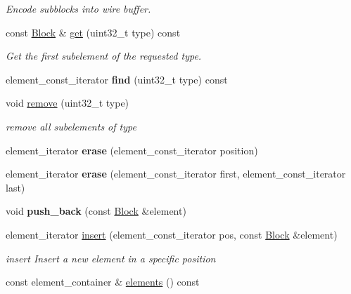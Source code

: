 \begin{DoxyCompactItemize}
\begin{DoxyCompactList}\small\item\em Encode subblocks into wire buffer. \end{DoxyCompactList}\item 
const \hyperlink{classndn_1_1Block}{Block} \& \hyperlink{classndn_1_1Block_ad863b30e2f979bc0b156c6f8fe77d568}{get} (uint32\+\_\+t type) const\hypertarget{classndn_1_1Block_ad863b30e2f979bc0b156c6f8fe77d568}{}\label{classndn_1_1Block_ad863b30e2f979bc0b156c6f8fe77d568}

\begin{DoxyCompactList}\small\item\em Get the first subelement of the requested type. \end{DoxyCompactList}\item 
element\+\_\+const\+\_\+iterator {\bfseries find} (uint32\+\_\+t type) const\hypertarget{classndn_1_1Block_a29f7c7bebf6071e413118fbebfffeb05}{}\label{classndn_1_1Block_a29f7c7bebf6071e413118fbebfffeb05}

\item 
void \hyperlink{classndn_1_1Block_a44165fec47ee9a27cdc2031a84fa6981}{remove} (uint32\+\_\+t type)
\begin{DoxyCompactList}\small\item\em remove all subelements of {\ttfamily type} \end{DoxyCompactList}\item 
element\+\_\+iterator {\bfseries erase} (element\+\_\+const\+\_\+iterator position)\hypertarget{classndn_1_1Block_a386cf1aa6b81c27b71a22802e2dd2c69}{}\label{classndn_1_1Block_a386cf1aa6b81c27b71a22802e2dd2c69}

\item 
element\+\_\+iterator {\bfseries erase} (element\+\_\+const\+\_\+iterator first, element\+\_\+const\+\_\+iterator last)\hypertarget{classndn_1_1Block_a1e8f4b40713995d036a0d14d65919a62}{}\label{classndn_1_1Block_a1e8f4b40713995d036a0d14d65919a62}

\item 
void {\bfseries push\+\_\+back} (const \hyperlink{classndn_1_1Block}{Block} \&element)\hypertarget{classndn_1_1Block_a5abf8fb2848c0b6e483159a87c8ff2d3}{}\label{classndn_1_1Block_a5abf8fb2848c0b6e483159a87c8ff2d3}

\item 
element\+\_\+iterator \hyperlink{classndn_1_1Block_af6f007399923508abe22956001ac126f}{insert} (element\+\_\+const\+\_\+iterator pos, const \hyperlink{classndn_1_1Block}{Block} \&element)
\begin{DoxyCompactList}\small\item\em insert Insert a new element in a specific position \end{DoxyCompactList}\item 
const element\+\_\+container \& \hyperlink{classndn_1_1Block_a31c10d3ed1f089c4a1992199cd9560fb}{elements} () const\hypertarget{classndn_1_1Block_a31c10d3ed1f089c4a1992199cd9560fb}{}\label{classndn_1_1Block_a31c10d3ed1f089c4a1992199cd9560fb}


\end{DoxyCompactItemize}
